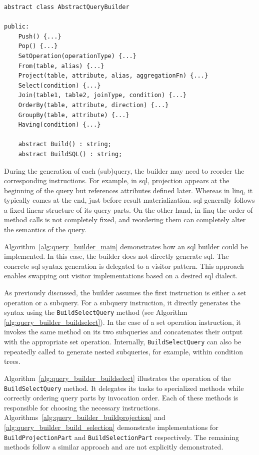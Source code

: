  \begin{lstlisting}[caption={AbstractQueryBuilder class structure}, language=pseudo, label={lst:aqb}]
abstract class AbstractQueryBuilder
    
public: 
    Push() {...}
    Pop() {...}
    SetOperation(operationType) {...}
    From(table, alias) {...}
    Project(table, attribute, alias, aggregationFn) {...}
    Select(condition) {...}
    Join(table1, table2, joinType, condition) {...}
    OrderBy(table, attribute, direction) {...}
    GroupBy(table, attribute) {...}
    Having(condition) {...}
    
    abstract Build() : string;
    abstract BuildSQL() : string;
 \end{lstlisting}

 
During the generation of each (sub)query, the builder may need to reorder the corresponding instructions. For example, in \acrshort{sql}, projection appears at the beginning of the query but references attributes defined later. Whereas in \acrshort{linq}, it typically comes at the end, just before result materialization. \acrshort{sql} generally follows a fixed linear structure of its query parts. On the other hand, in \acrshort{linq} the order of method calls is not completely fixed, and reordering them can completely alter the semantics of the query.

Algorithm~\ref{alg:query_builder_main} demonstrates how an \acrshort{sql} builder could be implemented. In this case, the builder does not directly generate \acrshort{sql}. The concrete \acrshort{sql} syntax generation is delegated to a visitor pattern. This approach enables swapping out visitor implementations based on a desired \acrshort{sql} dialect.

As previously discussed, the builder assumes the first instruction is either a set operation or a subquery. For a subquery instruction, it directly generates the syntax using the \texttt{BuildSelectQuery} method (see Algorithm \ref{alg:query_builder_buildselect}). In the case of a set operation instruction, it invokes the same method on its two subqueries and concatenates their output with the appropriate set operation. Internally, \texttt{BuildSelectQuery} can also be repeatedly called to generate nested subqueries, for example, within condition trees.

Algorithm~\ref{alg:query_builder_buildselect} illustrates the operation of the \texttt{BuildSelectQuery} method. It delegates its tasks to specialized methods while correctly ordering query parts by invocation order. Each of these methods is responsible for choosing the necessary instructions. Algorithms~\ref{alg:query_builder_buildprojection} and \ref{alg:query_builder_build_selection} demonstrate implementations for \texttt{BuildProjectionPart} and \texttt{BuildSelectionPart} respectively. The remaining methods follow a similar approach and are not explicitly demonstrated.

